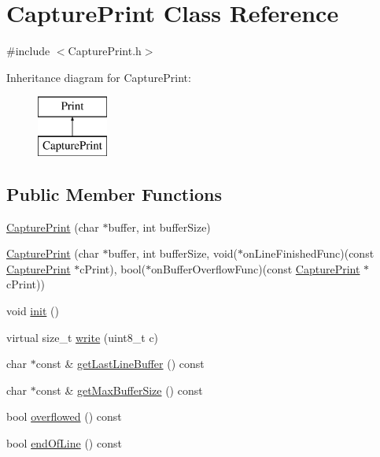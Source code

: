 \hypertarget{class_capture_print}{}\section{Capture\+Print Class Reference}
\label{class_capture_print}


{\ttfamily \#include $<$Capture\+Print.\+h$>$}

Inheritance diagram for Capture\+Print\+:\begin{figure}[H]
\begin{center}
\leavevmode
\includegraphics[height=2.000000cm]{class_capture_print}
\end{center}
\end{figure}
\subsection*{Public Member Functions}
\begin{DoxyCompactItemize}
\item 
\hyperlink{class_capture_print_a3b09811c1efd3e7a507627a965a4bdd8}{Capture\+Print} (char $\ast$buffer, int buffer\+Size)
\item 
\hyperlink{class_capture_print_a6e6741b8a50b6ad1c36ebc450798ba18}{Capture\+Print} (char $\ast$buffer, int buffer\+Size, void($\ast$on\+Line\+Finished\+Func)(const \hyperlink{class_capture_print}{Capture\+Print} $\ast$c\+Print), bool($\ast$on\+Buffer\+Overflow\+Func)(const \hyperlink{class_capture_print}{Capture\+Print} $\ast$c\+Print))
\item 
void \hyperlink{class_capture_print_a5ed2798b3b1009eaef1a7927bb50b908}{init} ()
\item 
virtual size\+\_\+t \hyperlink{class_capture_print_aa607f15e4a292e6496af34187732190e}{write} (uint8\+\_\+t c)
\item 
char $\ast$const \& \hyperlink{class_capture_print_a98d6d6a22d52f3a019251a6ca93257c5}{get\+Last\+Line\+Buffer} () const 
\item 
char $\ast$const \& \hyperlink{class_capture_print_a94376bd81d4fab70806fe520a82c2055}{get\+Max\+Buffer\+Size} () const 
\item 
bool \hyperlink{class_capture_print_a87ed8a53df62f7e6367c9885ddf3545d}{overflowed} () const 
\item 
bool \hyperlink{class_capture_print_a3925b40a6e5b62a6206f929ba0f72c7b}{end\+Of\+Line} () const 
\end{DoxyCompactItemize}
